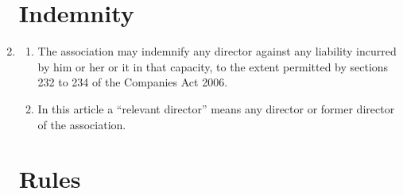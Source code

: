 \begin{enumerate}
\section{Indemnity}

\item\label{cls:directors-indemnity}
  \begin{enumerate}
  \item
    The association may indemnify any director against any
    liability incurred by him or her or it in that capacity, to the
    extent permitted by sections 232 to 234 of the Companies Act 2006.
  \item
    In this article a ``relevant director'' means any director or
    former director of the association.
  \end{enumerate}

\section{Rules}


\end{enumerate}
